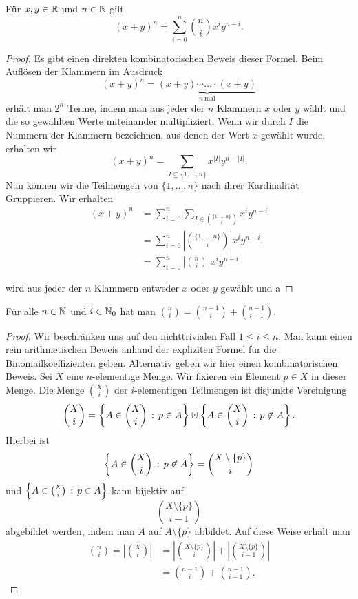 \begin{thm} 
	Für $x, y \in \mathbb{R}$ und $n \in \mathbb{N}$ gilt 
	\[
			(x+y)^n = \sum_{i=0}^n \binom{n}{i} x^i y^{n-i}. 
	\]
\end{thm} 
\begin{proof}
	Es gibt einen direkten kombinatorischen Beweis dieser Formel. Beim Auflösen der Klammern im Ausdruck 
	\[
			(x+y)^n = \underbrace{(x+y) \cdots \ldots \cdot (x+y)}_{n \ \text{mal}}
	\]
	erhält man $2^n$ Terme, indem man aus jeder der $n$ Klammern $x$ oder $y$ wählt und die so gewählten Werte miteinander multipliziert. Wenn wir durch $I$ die Nummern der Klammern bezeichnen, aus denen der Wert $x$ gewählt wurde, erhalten wir 
	\[
			(x+y)^n = \sum_{I \subseteq \{1,\ldots,n\}} x^{|I|} y^{n - |I|}. 
	\]
	Nun können wir die Teilmengen von $\{1,\ldots,n\}$ nach ihrer Kardinalität Gruppieren. Wir erhalten 
	\begin{align*}
			(x+y)^n & =\sum_{i=0}^n \sum_{I \in \binom{\{1,\ldots,n\}}{i}} x^i y^{n-i} 
			\\ & = \sum_{i=0}^n \left| \binom{\{1,\ldots,n\}}{i} \right| x^i y^{n-i}. 
			\\ & = \sum_{i=0}^n \left| \binom{n}{i} \right| x^i y^{n-i}
	\end{align*} 
	
	wird aus jeder der $n$ Klammern entweder $x$ oder $y$ gewählt und a
\end{proof} 

\begin{thm} \label{pascals:triangle} 
	Für alle $n \in \mathbb{N}$ und $i \in \mathbb{N}_0$ hat man $\binom{n}{i}  = \binom{n-1}{i}  + \binom{n-1}{i-1}$. 
\end{thm} 
\begin{proof} 
	Wir beschränken uns auf den nichttrivialen Fall $1 \le i \le n$. 
	Man kann einen rein arithmetischen Beweis anhand der expliziten Formel für die Binomailkoeffizienten geben. Alternativ geben wir hier einen kombinatorischen Beweis. Sei $X$ eine $n$-elementige Menge. Wir fixieren ein Element $p\in X$ in dieser Menge. Die Menge $\binom{X}{i}$ der $i$-elementigen Teilmengen ist disjunkte Vereinigung 
	\[
		\binom{X}{i} = \setcond{ A \in \binom{X}{i}}{p \in A} \cupdot \setcond{A \in \binom{X}{i}}{p \not\in A}. 
	\]
	Hierbei ist 
	\[
			\left\{ A \in \binom{X}{i} \,:\, p \not\in A \right\} = \binom{X \setminus \{p\}}{i}
	\]
	und $\left\{  A \in \binom{X}{i} \,:\, p \in A \right\}$ kann bijektiv auf 
	\[
			\binom{X \setminus \{p\}}{i-1}
	\]
	abgebildet werden, indem man $A$ auf $A \setminus \{p\}$ abbildet. Auf diese Weise erhält man 
	\begin{align*}
		\binom{n}{i} = \left| \binom{X}{i} \right| & = \left| \binom{X \setminus \{p\}}{i} \right| + \left| \binom{X \setminus \{p\}}{i-1}\right| 
		\\ & = \binom{n-1}{i} + \binom{n-1}{i-1}. 
	\end{align*} 
\end{proof} 

